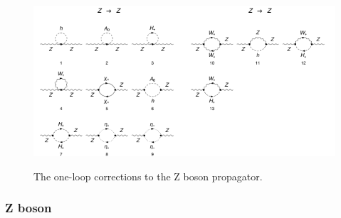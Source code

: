 \documentclass[11pt]{article}
\begin{document}
\begin{figure}[b!]
\center
\includegraphics[width=0.5\textwidth]{diagrams_V[2]_1_1.pdf}\includegraphics[width=0.5\textwidth]{diagrams_V[2]_1_2.pdf}
\caption{The one-loop corrections to the Z boson propagator.}\label{fig:ZZ}
\end{figure}

\subsubsection{Z boson}
\end{document}

